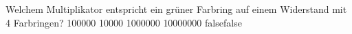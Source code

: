     {Welchem Multiplikator entspricht ein grüner Farbring auf einem Widerstand mit 4 Farbringen?}
    {100000}
    {10000}
    {1000000}
    {10000000}
    {false}{false}